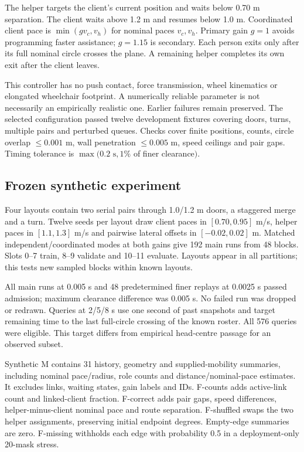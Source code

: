 \documentclass[conference]{IEEEtran}
\begin{document}
The helper targets the client's current position and waits below 0.70 m separation. The client waits above 1.2 m and resumes below 1.0 m. Coordinated client pace is $\min(gv_c,v_h)$ for nominal paces $v_c,v_h$. Primary gain $g=1$ avoids programming faster assistance; $g=1.15$ is secondary. Each person exits only after its full nominal circle crosses the plane. A remaining helper completes its own exit after the client leaves.

This controller has no push contact, force transmission, wheel kinematics or elongated wheelchair footprint. A numerically reliable parameter is not necessarily an empirically realistic one. Earlier failures remain preserved. The selected configuration passed twelve development fixtures covering doors, turns, multiple pairs and perturbed queues. Checks cover finite positions, counts, circle overlap $\leq0.001$ m, wall penetration $\leq0.005$ m, speed ceilings and pair gaps. Timing tolerance is $\max(0.2\text{ s},1\%$ of finer clearance$)$.

\subsection{Frozen synthetic experiment}
Four layouts contain two serial pairs through 1.0/1.2 m doors, a staggered merge and a turn. Twelve seeds per layout draw client paces in $[0.70,0.95]$ m/s, helper paces in $[1.1,1.3]$ m/s and pairwise lateral offsets in $[-0.02,0.02]$ m. Matched independent/coordinated modes at both gains give 192 main runs from 48 blocks. Slots 0--7 train, 8--9 validate and 10--11 evaluate. Layouts appear in all partitions; this tests new sampled blocks within known layouts.

All main runs at 0.005 s and 48 predetermined finer replays at 0.0025 s passed admission; maximum clearance difference was 0.005 s. No failed run was dropped or redrawn. Queries at 2/5/8 s use one second of past snapshots and target remaining time to the last full-circle crossing of the known roster. All 576 queries were eligible. This target differs from empirical head-centre passage for an observed subset.

Synthetic M contains 31 history, geometry and supplied-mobility summaries, including nominal pace/radius, role counts and distance/nominal-pace estimates. It excludes links, waiting states, gain labels and IDs. F-counts adds active-link count and linked-client fraction. F-correct adds pair gaps, speed differences, helper-minus-client nominal pace and route separation. F-shuffled swaps the two helper assignments, preserving initial endpoint degrees. Empty-edge summaries are zero. F-missing withholds each edge with probability 0.5 in a deployment-only 20-mask stress.
\end{document}
